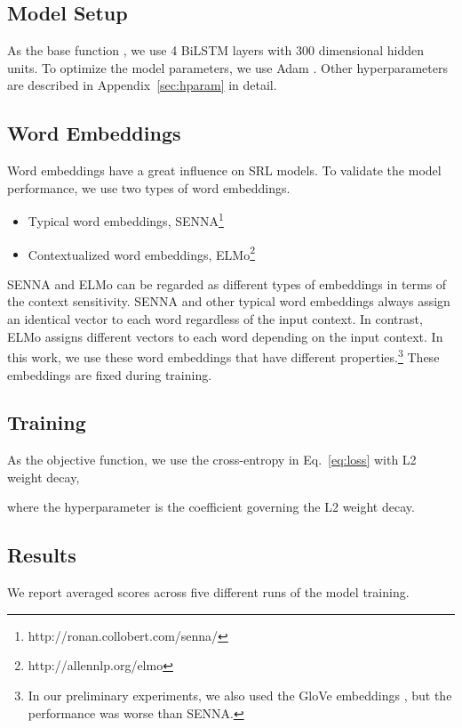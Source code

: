 \documentclass[11pt,a4paper]{article}
\begin{document}
\subsection{Model Setup}
\label{sec:model-setup}
As the base function , we use 4 BiLSTM layers with 300 dimensional hidden units.
To optimize the model parameters, we use Adam \cite{kingma:14}.
Other hyperparameters are described in Appendix~\ref{sec:hparam} in detail.

\subsection*{\bf Word Embeddings}
Word embeddings have a great influence on SRL models.
To validate the model performance, we use two types of word embeddings.
\begin{itemize}
\setlength{\parskip}{0cm} 
\setlength{\itemsep}{0cm} 
\item Typical word embeddings, SENNA\footnote{http://ronan.collobert.com/senna/} \cite{collobert:11}
\item Contextualized word embeddings, ELMo\footnote{http://allennlp.org/elmo} \cite{peters:18}
\end{itemize}

\noindent
SENNA and ELMo can be regarded as different types of embeddings in terms of the context sensitivity.
SENNA and other typical word embeddings always assign an identical vector to each word regardless of the input context.
In contrast, ELMo assigns different vectors to each word depending on the input context.
In this work, we use these word embeddings that have different properties.\footnote{In our preliminary experiments, we also used the GloVe embeddings \cite{pennington:14}, but the performance was worse than SENNA.}
These embeddings are fixed during training.

\subsection*{Training}
As the objective function, we use the cross-entropy  in Eq.~\ref{eq:loss} with L2 weight decay,


\noindent
where the hyperparameter  is the coefficient governing the L2 weight decay.


\subsection{Results}
\label{sec:label}
We report averaged scores across five different runs of the model training.
\end{document}
